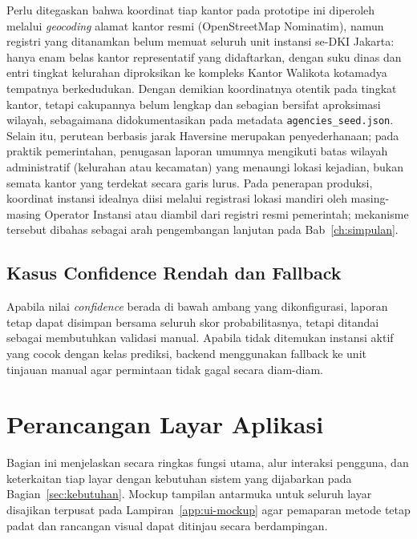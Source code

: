 Perlu ditegaskan bahwa koordinat tiap kantor pada prototipe ini diperoleh melalui \textit{geocoding} alamat kantor resmi (OpenStreetMap Nominatim), namun registri yang ditanamkan belum memuat seluruh unit instansi se-DKI Jakarta: hanya enam belas kantor representatif yang didaftarkan, dengan suku dinas dan entri tingkat kelurahan diproksikan ke kompleks Kantor Walikota kotamadya tempatnya berkedudukan. Dengan demikian koordinatnya otentik pada tingkat kantor, tetapi cakupannya belum lengkap dan sebagian bersifat aproksimasi wilayah, sebagaimana didokumentasikan pada metadata \texttt{agencies\_seed.json}. Selain itu, perutean berbasis jarak Haversine merupakan penyederhanaan; pada praktik pemerintahan, penugasan laporan umumnya mengikuti batas wilayah administratif (kelurahan atau kecamatan) yang menaungi lokasi kejadian, bukan semata kantor yang terdekat secara garis lurus. Pada penerapan produksi, koordinat instansi idealnya diisi melalui registrasi lokasi mandiri oleh masing-masing Operator Instansi atau diambil dari registri resmi pemerintah; mekanisme tersebut dibahas sebagai arah pengembangan lanjutan pada Bab~\ref{ch:simpulan}.

\subsection{Kasus Confidence Rendah dan Fallback}

Apabila nilai \textit{confidence} berada di bawah ambang yang dikonfigurasi, laporan tetap dapat disimpan bersama seluruh skor probabilitasnya, tetapi ditandai sebagai membutuhkan validasi manual. Apabila tidak ditemukan instansi aktif yang cocok dengan kelas prediksi, backend menggunakan fallback ke unit tinjauan manual agar permintaan tidak gagal secara diam-diam.

\section{Perancangan Layar Aplikasi}
\label{sec:layar}

Bagian ini menjelaskan secara ringkas fungsi utama, alur interaksi pengguna, dan keterkaitan tiap layar dengan kebutuhan sistem yang dijabarkan pada Bagian~\ref{sec:kebutuhan}. Mockup tampilan antarmuka untuk seluruh layar disajikan terpusat pada Lampiran~\ref{app:ui-mockup} agar pemaparan metode tetap padat dan rancangan visual dapat ditinjau secara berdampingan.

